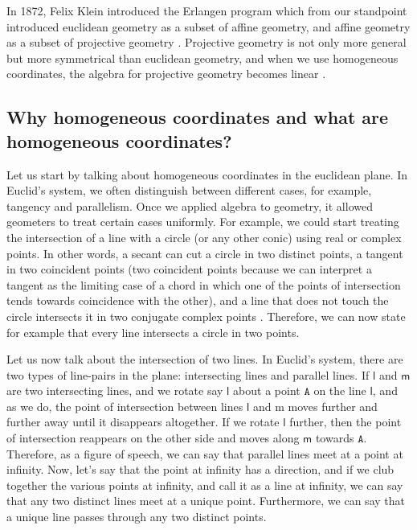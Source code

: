 \documentclass{article}
\newcommand{\cogoline}[1]{$\mathsf{#1}$}
\newcommand{\cogopoint}[1]{$\mathtt{#1}$}
\begin{document}
In 1872, Felix Klein introduced the Erlangen program which from our standpoint introduced euclidean geometry as a subset of affine geometry, and affine geometry as a subset of projective geometry \cite{wiki:Erlangen_program}. Projective geometry is not only more general but more symmetrical than euclidean geometry, and when we use homogeneous coordinates, the algebra for projective geometry becomes linear \cite{semple1952}.

\subsection{Why homogeneous coordinates and what are homogeneous coordinates?}
Let us start by talking about homogeneous coordinates in the euclidean plane. In Euclid's system, we often distinguish between different cases, for example, tangency and parallelism. Once we applied algebra to geometry, it allowed geometers to treat certain cases uniformly. For example, we could start treating the intersection of a line with a circle (or any other conic) using real or complex points. In other words, a secant can cut a circle in two distinct points, a tangent in two coincident points (two coincident points because we can interpret a tangent as the limiting case of a chord in which one of the points of intersection tends towards coincidence with the other), and a line that does not touch the circle intersects it in two conjugate complex points \cite{semple1952}. Therefore, we can now state for example that every line intersects a circle in two points.

Let us now talk about the intersection of two lines. In Euclid's system, there are two types of line-pairs in the plane: intersecting lines and parallel lines. If \cogoline{l} and \cogoline{m} are two intersecting lines, and we rotate say \cogoline{l} about a point \cogopoint{A} on the line \cogoline{l}, and as we do, the point of intersection between lines \cogoline{l} and m moves further and further away until it disappears altogether. If we rotate \cogoline{l} further, then the point of intersection reappears on the other side and moves along \cogoline{m} towards \cogopoint{A}. Therefore, as a figure of speech, we can say that parallel lines meet at a point at infinity. Now, let's say that the point at infinity has a direction, and if we club together the various points at infinity, and call it as a line at infinity, we can say that any two distinct lines meet at a unique point. Furthermore, we can say that a unique line passes through any two distinct points.
\end{document}
